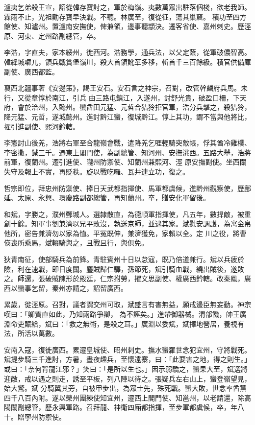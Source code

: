 \begin{pinyinscope}
 瀘夷乞弟殺王宣，詔從韓存寶討之，軍於梅嶺。夷數萬眾出駐落個棧，欲老我師。霖雨不止，光祖勸存寶早決戰。不聽。林廣至，復從征，蕩其巢窟。
 積功至四方館使、知瀘州。置瀘南安撫使，俾兼領，邊事聽顓決。遷客省使、嘉州刺史。歷涇原、河東、定州路副總管，卒。



 李浩，字直夫，家本綏州，徙西河。浩務學，通兵法，以父定蔭，從軍破儂智高。韓絳城囉兀，領兵戰賞堡嶺川，殺大首領訛革多移，斬首千三百餘級。積官供備庫副使、廣西都監。



 裒西北疆事著《安邊策》，謁王安石。安石言之神宗，召對，改管幹麟府兵馬。未行，又從章惇於南江，引兵
 由三路屯鎮江，入遂州，討舒光貴，破盈口柵，下天府，會於洽州，入懿州。蠻酋田元猛、元哲合狤狑拒官軍，浩分兵擊之，殺狤狑，降元猛、元哲，遂城懿州。進討黔江蠻，復城黔江。惇上其功，謂不當與他將比，擢引進副使、熙河鈐轄。



 李憲討山後羌，浩將右軍至合龍嶺會戰，遣降羌乞啀輕騎突敵帳，俘其酋冷雞樸、李密撒，馘三千。遷東上閣門使，為副總管、知河州、安撫洮西。五路大舉，浩將前軍，復蘭州。遷引進使、隴州防禦使、知蘭州兼熙河、涇
 原安撫副使。坐西關失守及報上不實，再貶秩。旋以戰吃囉、瓦井連立功，復之。



 哲宗即位，拜忠州防禦使、捧日天武都指揮使、馬軍都虞候，進黔州觀察使，歷鄜延、太原、永興、環慶路副都總管，再知蘭州。卒，贈安化軍留後。



 和斌，字勝之，濮州鄄城人。選隸散直，為德順軍指揮使，凡五年，數捍敵，被重創十餘。知軍事劉兼濟以兄平敗沒，執送京師，並逮其家。斌慰安調護，為寓金帛他所，密告兼濟勿以家為恤。平冤既伸，兼濟獲免，家賴以全。定
 川之役，將曹偀喪所乘馬，斌輟騎與之，且戰且行，與俱免。



 狄青南征，使部騎兵為前鋒。青駐賓州十日以怠寇，既乃倍道兼行。斌以兵疲於險，利在速戰，即日度關。鏖賊歸仁驛，孫節死，斌引騎血戰，繞出賊後，遂敗之。師還，張破賊陳形於殿廷，仁宗拊勞，擢文思副使、權廣西鈐轄。改秦鳳，廣西以蠻事乞留，秦州亦請之，詔留廣西。



 累歲，徙涇原。召對，議者謂交州可取，斌盛言有害無益，願戒邊臣無妄動。神宗嘆曰：「卿質直如此，乃知兩路爭卿，
 為不誣矣。」進帶御器械。渭部饑，帥王廣淵命吏賑給，斌曰：「救之無術，是殺之耳。」廣淵以委斌，斌擇地營居，養視有法，所活以萬數。



 安南入寇，復徙廣西。累遷皇城使、昭州刺史。撫水蠻羅世念犯宜州，守將戰死。斌提步騎三千進討，方暑，晝夜趣兵，至懷遠寨，曰：「此要害之地，得之則生。」或曰：「奈何背龍江邪？」笑曰：「是所以生也。」因示弱驕之，蠻果大至，斌選將迎敵，戒以遇之則走，誘至平板，列八陣以待之。張疑兵左右山上，蠻登嶺望見，始大驚。斌
 分騎翼其旁，自被甲步出，為眾士先，殊死戰。蠻大敗，世念率酋黨四千八百內附。遂以榮州團練使知宜州，遷西上閣門使、知邕州，以老請還，除高陽關副總管，歷永興軍路。召拜龍、神衛四廂都指揮，至步軍都虞候，卒，年八十。贈寧州防禦使。




\end{pinyinscope}
